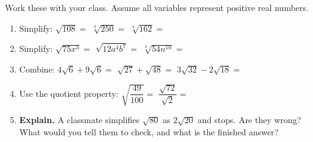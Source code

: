 \documentclass[10pt]{article}
\begin{document}
\begin{practicebox}
Work these with your class. Assume all variables represent positive real numbers.
\begin{enumerate}[leftmargin=1.7em, itemsep=5pt]
  \item Simplify: \; $\sqrt{108}=$  \quad $\sqrt[3]{250}=$  \quad
        $\sqrt[4]{162}=$ 
  \item Simplify: \; $\sqrt{75x^{3}}=$  \quad
        $\sqrt{12a^{4}b^{7}}=$  \quad
        $\sqrt[3]{54n^{10}}=$ 
  \item Combine: \; $4\sqrt6+9\sqrt6=$  \quad $\sqrt{27}+\sqrt{48}=$  \quad
        $3\sqrt{32}-2\sqrt{18}=$ 
  \item Use the quotient property: \; $\sqrt{\dfrac{49}{100}}=$  \quad
        $\dfrac{\sqrt{72}}{\sqrt{2}}=$ 
  \item \textbf{Explain.} A classmate simplifies $\sqrt{80}$ as $2\sqrt{20}$ and stops. Are they
        wrong? What would you tell them to check, and what is the finished answer? 
\end{enumerate}
\end{practicebox}
\end{document}
